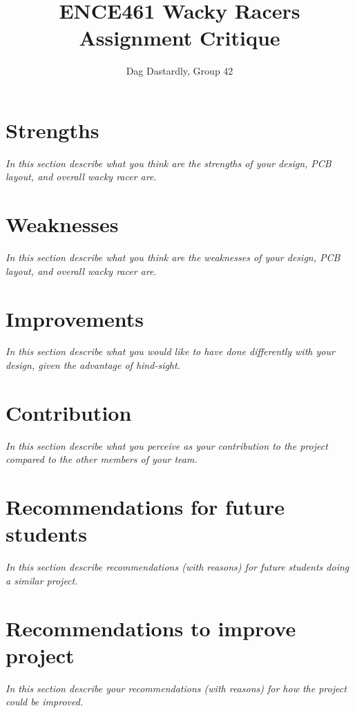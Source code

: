 \documentclass[a4paper,12pt]{article}
\title{ENCE461 Wacky Racers Assignment Critique}
\author{Dag Dastardly, Group 42}
\date{}
\newcommand{\comment}[1]{\emph{\color{blue}#1}}
\begin{document}
\maketitle

\section{Strengths}

\comment{In this section describe what you think are the strengths of
  your design, PCB layout, and overall wacky racer are.}


\section{Weaknesses}

\comment{In this section describe what you think are the weaknesses of
  your design, PCB layout, and overall wacky racer are.}


\section{Improvements}

\comment{In this section describe what you would like to have done
  differently with your design, given the advantage of hind-sight.}


\section{Contribution}

\comment{In this section describe what you perceive as your contribution
  to the project compared to the other members of your team.}



\section{Recommendations for future students}

\comment{In this section describe recommendations (with reasons) for
  future students doing a similar project.}



\section{Recommendations to improve project}

\comment{In this section describe your recommendations (with reasons) for
  how the project could be improved.}
\end{document}
